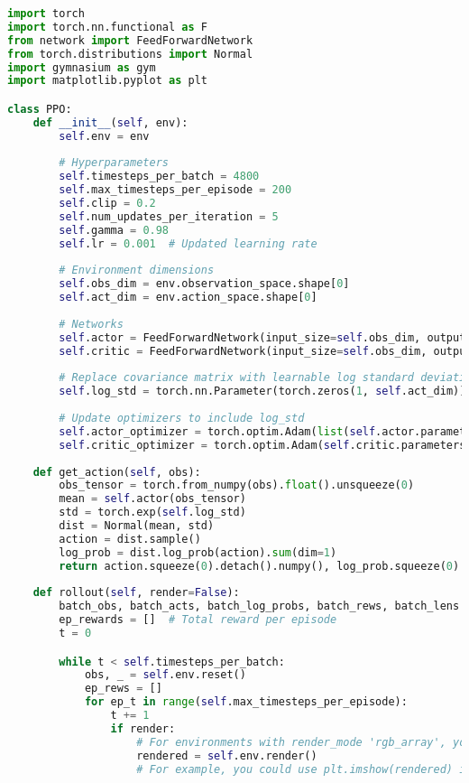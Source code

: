 \documentclass[12pt]{extreport} %
\begin{document}
\begin{lstlisting}[language=Python, caption={PPO Implementation (ppo.py)}, label={code:ppo}]
import torch
import torch.nn.functional as F
from network import FeedForwardNetwork
from torch.distributions import Normal
import gymnasium as gym
import matplotlib.pyplot as plt

class PPO:
    def __init__(self, env):
        self.env = env
        
        # Hyperparameters
        self.timesteps_per_batch = 4800
        self.max_timesteps_per_episode = 200
        self.clip = 0.2
        self.num_updates_per_iteration = 5
        self.gamma = 0.98
        self.lr = 0.001  # Updated learning rate
        
        # Environment dimensions
        self.obs_dim = env.observation_space.shape[0]
        self.act_dim = env.action_space.shape[0]
        
        # Networks
        self.actor = FeedForwardNetwork(input_size=self.obs_dim, output_size=self.act_dim)
        self.critic = FeedForwardNetwork(input_size=self.obs_dim, output_size=1)
        
        # Replace covariance matrix with learnable log standard deviation
        self.log_std = torch.nn.Parameter(torch.zeros(1, self.act_dim))
        
        # Update optimizers to include log_std
        self.actor_optimizer = torch.optim.Adam(list(self.actor.parameters()) + [self.log_std], lr=self.lr)
        self.critic_optimizer = torch.optim.Adam(self.critic.parameters(), lr=self.lr)
    
    def get_action(self, obs):
        obs_tensor = torch.from_numpy(obs).float().unsqueeze(0)
        mean = self.actor(obs_tensor)
        std = torch.exp(self.log_std)
        dist = Normal(mean, std)
        action = dist.sample()
        log_prob = dist.log_prob(action).sum(dim=1)
        return action.squeeze(0).detach().numpy(), log_prob.squeeze(0).detach()
    
    def rollout(self, render=False):
        batch_obs, batch_acts, batch_log_probs, batch_rews, batch_lens = [], [], [], [], []
        ep_rewards = []  # Total reward per episode
        t = 0

        while t < self.timesteps_per_batch:
            obs, _ = self.env.reset()
            ep_rews = []
            for ep_t in range(self.max_timesteps_per_episode):
                t += 1
                if render:
                    # For environments with render_mode 'rgb_array', you may need to display the returned image.
                    rendered = self.env.render()
                    # For example, you could use plt.imshow(rendered) if desired.
                    

\end{lstlisting}
\end{document}
